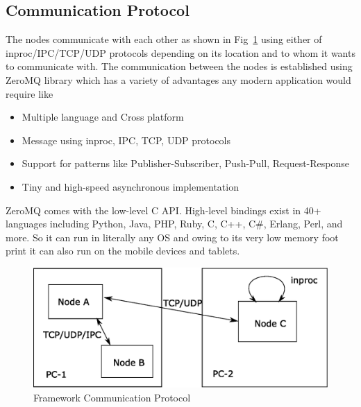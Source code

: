 \subsection{Communication Protocol}	
	The nodes communicate with each other as shown in Fig~\ref{fig:framework} using either of inproc/IPC/TCP/UDP protocols depending on its location and to whom it wants to communicate with. The communication between the nodes is established using ZeroMQ\cite{ZeroMQ} library which has a variety of advantages any modern application would require like  
\begin{itemize}
\item Multiple language and Cross platform
\item Message using inproc, IPC, TCP, UDP protocols
\item Support for patterns like Publisher-Subscriber, Push-Pull, Request-Response
\item Tiny and high-speed asynchronous implementation
\end{itemize}
	ZeroMQ comes with the low-level C API. High-level bindings exist in 40+ languages including Python, Java, PHP, Ruby, C, C++, C\#, Erlang, Perl, and more. So it can run in literally any OS and owing to its very low memory foot print it can also run on the mobile devices and tablets.
\begin{figure}
\centering
\includegraphics[width=\textwidth]{assets/architecture_comm.eps}
\caption[Framework Communication Protocol]{Framework Communication Protocol}
\label{fig:framework}
\end{figure}
